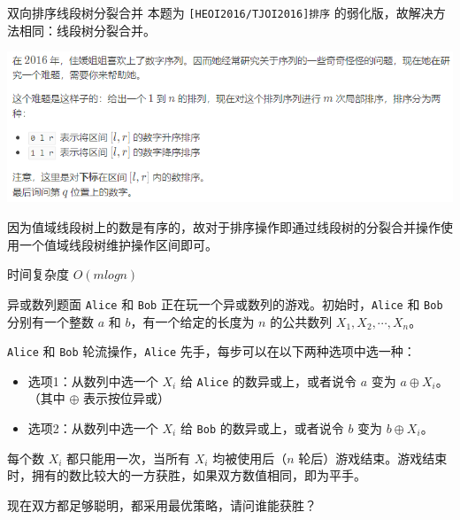 \documentclass{pptt}
\begin{document}
\begin{frame}{双向排序}{线段树分裂合并}
    本题为 \texttt{[HEOI2016/TJOI2016]排序} 的弱化版，故解决方法相同：线段树分裂合并。

    \begin{center}
        \includegraphics[scale=0.4]{images/sort.png}
    \end{center}

    因为值域线段树上的数是有序的，故对于排序操作即通过线段树的分裂合并操作使用一个值域线段树维护操作区间即可。

    时间复杂度 $O(mlogn)$
\end{frame}

\begin{frame}{异或数列}{题面}
    \texttt{Alice} 和 \texttt{Bob} 正在玩一个异或数列的游戏。初始时，\texttt{Alice} 和 \texttt{Bob} 分别有一个整数 $a$ 和 $b$，有一个给定的长度为 $n$ 的公共数列 $X_1,X_2,\cdots,X_n$。

    \texttt{Alice} 和 \texttt{Bob} 轮流操作，\texttt{Alice} 先手，每步可以在以下两种选项中选一种：

    \begin{itemize}
        \item 选项1：从数列中选一个 $X_i$ 给 \texttt{Alice} 的数异或上，或者说令 $a$ 变为 $a \oplus X_i$。（其中 $\oplus$ 表示按位异或）
        \item 选项2：从数列中选一个 $X_i$ 给 \texttt{Bob} 的数异或上，或者说令 $b$ 变为 $b \oplus X_i$。
    \end{itemize}

    每个数 $X_i$ 都只能用一次，当所有 $X_i$ 均被使用后（$n$ 轮后）游戏结束。游戏结束时，拥有的数比较大的一方获胜，如果双方数值相同，即为平手。

    现在双方都足够聪明，都采用最优策略，请问谁能获胜？
\end{frame}
\end{document}
